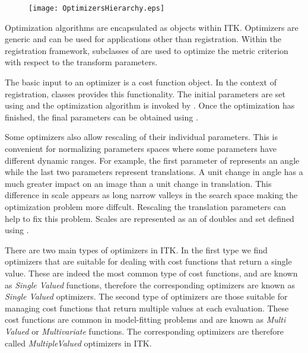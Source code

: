 


\begin{figure}
\center
\texttt{[image: OptimizersHierarchy.eps]}
\label{fig:OptimizersHierarchy}
\end{figure}

Optimization algorithms are encapsulated as  objects
within ITK. Optimizers are generic and can be used for applications other than
registration.  Within the registration framework, subclasses of
 are used to optimize the metric
criterion with respect to the transform parameters.


The basic input to an optimizer is a cost function object. In the context
of registration,  classes provides this functionality.
The initial parameters are set using  and
the optimization algorithm is invoked by .
Once the optimization has finished, the final parameters can be obtained
using .

Some optimizers also allow rescaling of their individual parameters. This is
convenient for normalizing parameters spaces where some parameters have
different dynamic ranges. For example, the first parameter of
 represents an angle while the last two parameters
represent translations. A unit change in angle has a much greater impact on an
image than a unit change in translation. This difference in scale appears as
long narrow valleys in the search space making the optimization problem more
diffcult. Rescaling the translation parameters can help to fix this problem.
Scales are represented as an  of doubles and set defined using
.

There are two main types of optimizers in ITK. In the first type we find
optimizers that are suitable for dealing with cost functions that return a
single value. These are indeed the most common type of cost functions, and are
known as \emph{Single Valued} functions, therefore the corresponding optimizers
are known as \emph{Single Valued} optimizers. The second type of optimizers are
those suitable for managing cost functions that return multiple values at each
evaluation. These cost functions are common in model-fitting problems and are
known as \emph{Multi Valued} or \emph{Multivariate} functions.  The
corresponding optimizers are therefore called \emph{MultipleValued} optimizers
in ITK.


